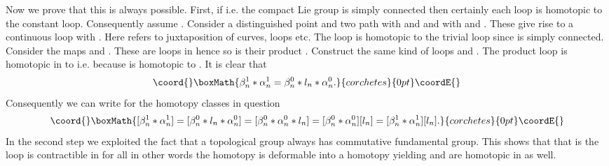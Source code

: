 \documentclass[a4paper,12pt,draft]{article}
\begin{document}
Now we prove that this is always possible. First, if \coordHE{} i.e. the
compact Lie group is simply connected then certainly each loop \coordHE{} is
homotopic to the constant loop. Consequently assume \coordHE{}.
Consider a distinguished point \coordHE{} and two path \coordHE{} with \coordHE{} and \coordHE{}
and \coordHE{} with \coordHE{} and
\coordHE{}. These give rise to a continuous loop \coordHE{} with \coordHE{}. Here \myHighlight{$*$}\coordHE{} refers
to juxtaposition of curves, loops etc. 
The loop \coordHE{} is homotopic to the trivial loop since \coordHE{} is
simply connected. Consider the maps \coordHE{} and \coordHE{}. These are loops in \coordHE{} hence so is their product
\coordHE{}. Construct the same kind of loops
\coordHE{} and \coordHE{}.
The product loop \coordHE{} is homotopic in \coordHE{} to
\coordHE{} i.e. 
\coordHE{} because \coordHE{} is
homotopic to \coordHE{}. It is clear that 
\[\coord{}\boxMath{\beta_n^1*\alpha_n^1 =\beta^0_n*l_n*\alpha^0_n.}{corchetes}{0pt}\coordE{}\]
Consequently we can write for the homotopy classes in question
\[\coord{}\boxMath{[\beta_n^1*\alpha_n^1]=[\beta^0_n*l_n*\alpha^0_n]=[\beta^0_n*\alpha^0_n
*l_n]=[\beta^0_n*\alpha^0_n][l_n]=[\beta_n^1*\alpha_n^1][l_n].}{corchetes}{0pt}\coordE{}\] 
In the second step we exploited the fact that a topological
group always has commutative fundamental group. This shows that \coordHE{} 
that is the loop \coordHE{} is contractible in \coordHE{} for all \coordHE{} in
other words the homotopy \coordHE{} is deformable into a homotopy \coordHE{} yielding
\coordHE{} and \coordHE{} are homotopic in \myHighlight{$\left[ (W_k, x_1,...,x_k, i^0),
(G,e)\right]$}\coordHE{} as well. \myHighlight{$\Diamond$}\coordHE{}
\vspace{0.1in}
\end{document}
